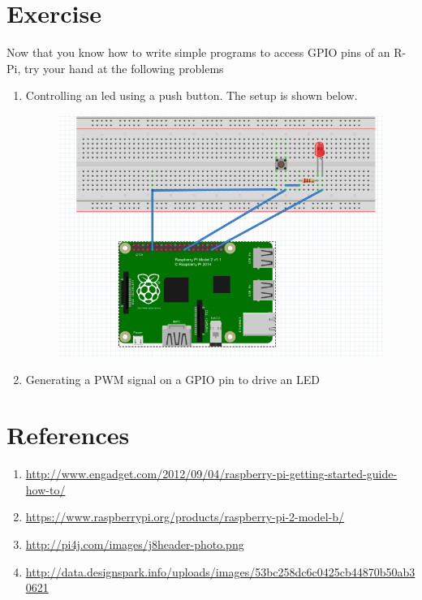 \documentclass[11pt,a4paper]{article}
\begin{document}
	\section{Exercise}
	Now that you know how to write simple programs to access GPIO pins of an R-Pi, try your hand at the following problems
	\begin{enumerate}
		\item Controlling an led using a push button. The setup is shown below.
		\begin{figure}[h!]
			\includegraphics[scale=0.4]{GPIO.png}
			\centering
		\end{figure}
		\item Generating a PWM signal on a GPIO pin to drive an LED 
	\end{enumerate}
	
	\section{References}
	\begin{enumerate}
		\item \url{http://www.engadget.com/2012/09/04/raspberry-pi-getting-started-guide-how-to/}
		\item \url{https://www.raspberrypi.org/products/raspberry-pi-2-model-b/}
		\item \url{http://pi4j.com/images/j8header-photo.png}
		\item \url{http://data.designspark.info/uploads/images/53bc258dc6c0425cb44870b50ab30621}
	\end{enumerate}
	
	
\end{document}
